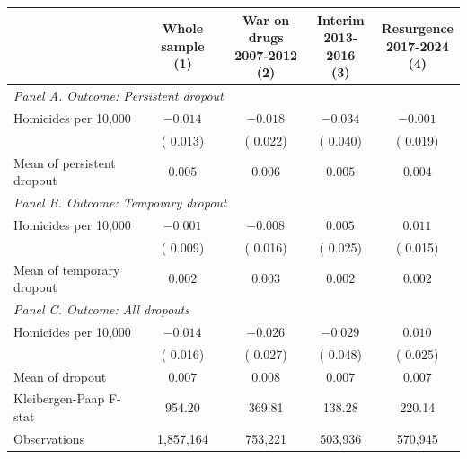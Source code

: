 \begin{tabular}{l c c c c}
\hline\hline
 & \shortstack{Whole sample \\ (1)} & \shortstack{War on drugs \\ 2007-2012 \\ (2)} & \shortstack{Interim \\ 2013-2016 \\ (3)} & \shortstack{Resurgence \\ 2017-2024 \\ (4)} \\
\hline
\multicolumn{5}{l}{{\small \textit{Panel A. Outcome: Persistent dropout}}} \\
Homicides per 10,000
 & $-0.014^{}$ & $-0.018^{}$ & $-0.034^{}$ & $-0.001^{}$ \\
 & ( 0.013) & ( 0.022) & ( 0.040) & ( 0.019) \\
Mean of persistent dropout
 & $ 0.005$ & $ 0.006$ & $ 0.005$ & $ 0.004$ \\
\hline
\multicolumn{5}{l}{{\small \textit{Panel B. Outcome: Temporary dropout}}} \\
Homicides per 10,000
 & $-0.001^{}$ & $-0.008^{}$ & $ 0.005^{}$ & $ 0.011^{}$ \\
 & ( 0.009) & ( 0.016) & ( 0.025) & ( 0.015) \\
Mean of temporary dropout
 & $ 0.002$ & $ 0.003$ & $ 0.002$ & $ 0.002$ \\
\hline
\multicolumn{5}{l}{{\small \textit{Panel C. Outcome: All dropouts}}} \\
Homicides per 10,000
 & $-0.014^{}$ & $-0.026^{}$ & $-0.029^{}$ & $ 0.010^{}$ \\
 & ( 0.016) & ( 0.027) & ( 0.048) & ( 0.025) \\
Mean of dropout
 & $ 0.007$ & $ 0.008$ & $ 0.007$ & $ 0.007$ \\
\hline
Kleibergen-Paap F-stat
 & 954.20 & 369.81 & 138.28 & 220.14 \\
\hline
Observations
 & 1,857,164 &   753,221 &   503,936 &   570,945 \\
\hline\hline
\end{tabular}
